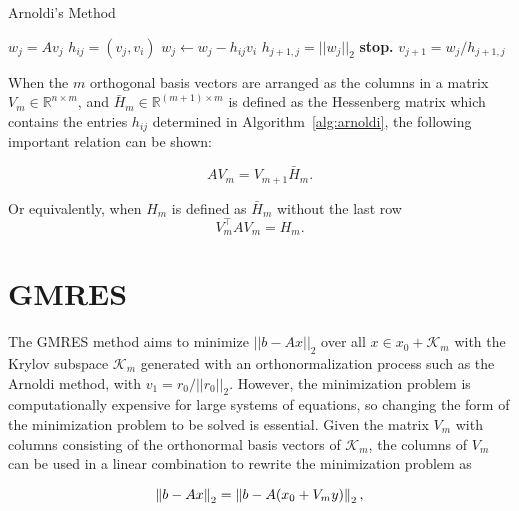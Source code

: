 \begin{algorithm}
	\caption{Arnoldi's Method}\label{alg:arnoldi}
	\begin{algorithmic}[1]
                \State $w_j = A v_j$
                    \State $h_{ij} = \left(v_j, v_i\right)$
                    \State $w_j \gets w_j - h_{ij}v_i$
                \EndFor
                \State $h_{j+1, j} = ||w_j||_2$
                    \State \textbf{stop.}
                \EndIf
                \State $v_{j+1} = w_j/h_{j+1, j}$
            \EndFor
		\EndProcedure
	\end{algorithmic}
\end{algorithm}

When the $m$ orthogonal basis vectors are arranged as the columns in a matrix $V_m \in \mathbb{R}^{n \times m}$, and $\bar{H}_m \in \mathbb{R}^{(m+1) \times m}$ is defined as the Hessenberg matrix which contains the entries $h_{ij}$ determined in Algorithm~\ref{alg:arnoldi}, the following important relation can be shown:

\begin{equation}
    \label{eq:arnoldi_relation}
    A V_m = V_{m+1}\bar{H}_m.
\end{equation}

Or equivalently, when $H_m$ is defined as $\bar{H}_m$ without the last row
\begin{equation}
    \label{eq:arnoldi_relation2}
    V^\top_m A V_m = H_m.
\end{equation}

\section{GMRES}
The GMRES method aims to minimize $||b - Ax||_2$ over all $x \in x_0 + \mathcal{K}_m $ with the Krylov subspace $\mathcal{K}_m$ generated with an orthonormalization process such as the Arnoldi method, with $v_1 = r_0/||r_0||_2$. However, the minimization problem is computationally expensive for large systems of equations, so changing the form of the minimization problem to be solved is essential. Given the matrix $V_m$ with columns consisting of the orthonormal basis vectors of $\mathcal{K}_m$, the columns of $V_m$ can be used in a linear combination to rewrite the minimization problem as

\begin{equation}
    \left\lVert b - Ax\right\rVert_2  = \left\lVert b - A(x_0 + V_m y)\right\rVert_2,
\end{equation}


